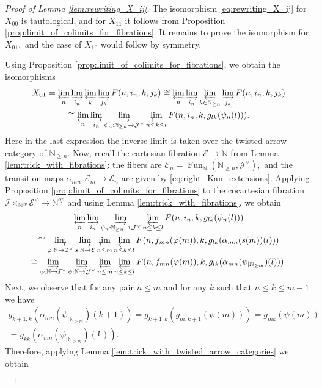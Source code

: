 \documentclass[11pt,leqno]{amsart}
\numberwithin{equation}{section}
\def\N{\mathbb{N}}
\newcommand{\indlim}[1][]{\mathop{\varinjlim}\limits_{#1}}
\newcommand{\prolim}[1][]{\mathop{\varprojlim}\limits_{#1}}
\newcommand{\cJ}{{\mathcal J}}
\newcommand{\cI}{{\mathcal I}}
\newcommand{\cE}{{\mathcal E}}
\newcommand{\Fun}{\operatorname{Fun}}
\begin{document}
\begin{proof}[Proof of Lemma \ref{lem:rewriting_X_ij}]
The isomorphism \eqref{eq:rewriting_X_ij} for $X_{00}$ is tautological, and for $X_{11}$ it follows from Proposition \ref{prop:limit_of_colimits_for_fibrations}.
It remains to prove the isomorphism for $X_{01},$ and the case of $X_{10}$ would follow by symmetry.

Using Proposition \ref{prop:limit_of_colimits_for_fibrations}, we obtain the isomorphisms
\begin{multline*}
X_{01} = \prolim[n]\indlim[i_n]\prolim[k]\indlim[j_k]F(n,i_n,k,j_k)\cong \prolim[n]\indlim[i_n]\prolim[k\in\N_{\geq n}]\indlim[j_k]F(n,i_n,k,j_k)\\
\cong \prolim[n]\indlim[i_n]\indlim[\psi_n:\N_{\geq n}\to\cJ^{\vee}]\prolim[n\leq k\leq l]F(n,i_n,k,g_{lk}(\psi_n(l))).
\end{multline*}
Here in the last expression the inverse limit is taken over the twisted arrow category of $\N_{\geq n}.$ Now, recall the cartesian fibration $\cE\to\N$ from Lemma \ref{lem:trick_with_fibrations}: the fibers are $\cE_n=\Fun_{\N}(\N_{\geq n},\cJ^{\vee}),$ and the transition maps $\alpha_{mn}:\cE_m\to\cE_n$ are given by \eqref{eq:right_Kan_extensions}. Applying Proposition \ref{prop:limit_of_colimits_for_fibrations} to the cocartesian fibration $\cI\times_{\N^{op}}\cE^{\vee}\to \N^{op}$ and using Lemma \ref{lem:trick_with_fibrations}, we obtain
\begin{multline*}
\prolim[n]\indlim[i_n]\indlim[\psi_n:\N_{\geq n}\to\cJ^{\vee}]\prolim[n\leq k\leq l]F(n,i_n,k,g_{lk}(\psi_n(l)))\\
\cong \indlim[\varphi:\N\to\cI^{\vee}]\indlim[s:\N\to\cE]\prolim[n\leq m]\prolim[n\leq k\leq l]F(n,f_{mn}(\varphi(m)),k,g_{lk}(\alpha_{mn}(s(m))(l)))\\
\cong \indlim[\varphi:\N\to\cI^{\vee}]\indlim[\psi:\N\to\cJ^{\vee}]\prolim[n\leq m]\prolim[n\leq k\leq l]F(n,f_{mn}(\varphi(m)),k,g_{lk}(\alpha_{mn}(\psi_{\mid \N_{\geq m}})(l))).
\end{multline*} 
Next, we observe that for any pair $n\leq m$ and for any $k$ such that $n\leq k\leq m-1$ we have
\begin{multline*}
g_{k+1,k}(\alpha_{mn}(\psi_{\mid \N_{\geq m}})(k+1)) = g_{k+1,k}(g_{m,k+1}(\psi(m))) = g_{mk}(\psi(m))\\
= g_{kk}(\alpha_{mn}(\psi_{\mid \N_{\geq m}})(k)).
\end{multline*}
Therefore, applying Lemma \ref{lem:trick_with_twisted_arrow_categories} we obtain 
\begin{multline*}

\end{multline*}
\end{proof}
\end{document}
